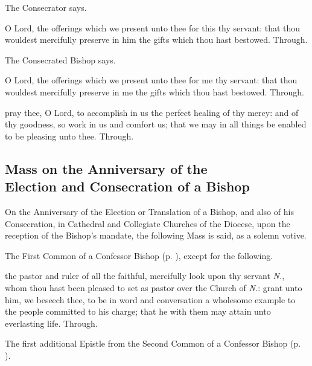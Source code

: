 \secret
\begin{rubric}
	The Consecrator says.
\end{rubric}
 O Lord, the offerings which we present unto thee for this thy servant: that thou wouldest mercifully preserve in him the gifts which thou hast bestowed. Through.

\begin{rubric}
	The Consecrated Bishop says.
\end{rubric}
 O Lord, the offerings which we present unto thee for me thy servant: that thou wouldest mercifully preserve in me the gifts which thou hast bestowed. Through.

\postcommunion
{} pray thee, O Lord, to accomplish in us the perfect healing of thy mercy: and of thy goodness, so work in us and comfort us; that we may in all things be enabled to be pleasing unto thee. Through.


\clearpage
\subsection{Mass on the Anniversary of the\\Election and Consecration of a Bishop}
\begin{rubric}
	On the Anniversary of the Election or Translation of a Bishop, and also of his Consecration, in Cathedral and Collegiate Churches of the Diocese, upon the reception of the Bishop's mandate, the following Mass is said, as a solemn votive.
\end{rubric}

\begin{rubric}
	The First Common of a Confessor Bishop (p. \pageref{CommonConfessorBishopI}), except for the following.
\end{rubric}

\collect
{} the pastor and ruler of all the faithful, mercifully look upon thy servant \textit{N.}, whom thou hast been pleased to set as pastor over the Church of \textit{N.}: grant unto him, we beseech thee, to be in word and conversation a wholesome example to the people committed to his charge; that he with them may attain unto everlasting life. Through.

\begin{rubric}
	The first additional Epistle from the Second Common of a Confessor Bishop (p. \pageref{Hebrews51}).
\end{rubric}

